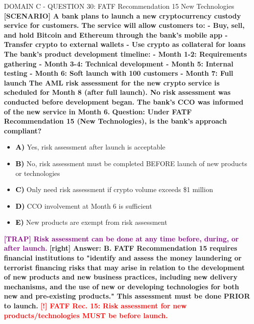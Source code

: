 \documentclass[11pt,a4paper]{beamer}
\newcommand{\redflag}[1]{\textcolor{red}{\textbf{[!] #1}}}
\newcommand{\trap}[1]{\textcolor{purple}{\textbf{[TRAP] #1}}}
\newcommand{\correct}[1]{\textcolor{green!50!black}{\textbf{[right] #1}}}
\newcommand{\scenario}[1]{\textcolor{blue!70!black}{\textbf{[SCENARIO] #1}}}
\newcommand{\option}[1]{\textcolor{black}{\textbf{#1}}}
\begin{document}
\begin{frame}{DOMAIN C - QUESTION 30: FATF Recommendation 15 New Technologies}
\scenario{A bank plans to launch a new cryptocurrency custody service for customers. The service will allow customers to:
- Buy, sell, and hold Bitcoin and Ethereum through the bank's mobile app
- Transfer crypto to external wallets
- Use crypto as collateral for loans
The bank's product development timeline:
- Month 1-2: Requirements gathering
- Month 3-4: Technical development
- Month 5: Internal testing
- Month 6: Soft launch with 100 customers
- Month 7: Full launch
The AML risk assessment for the new crypto service is scheduled for Month 8 (after full launch). No risk assessment was conducted before development began. The bank's CCO was informed of the new service in Month 6.}
\vspace{0.2cm}
\textbf{Question: Under FATF Recommendation 15 (New Technologies), is the bank's approach compliant?}
\vspace{0.1cm}
\begin{itemize}
    \item \option{A)} Yes, risk assessment after launch is acceptable
    \item \option{B)} No, risk assessment must be completed BEFORE launch of new products or technologies
    \item \option{C)} Only need risk assessment if crypto volume exceeds \$1 million
    \item \option{D)} CCO involvement at Month 6 is sufficient
    \item \option{E)} New products are exempt from risk assessment
\end{itemize}
\vspace{0.2cm}
\trap{Risk assessment can be done at any time before, during, or after launch.}
\correct{Answer: B. FATF Recommendation 15 requires financial institutions to "identify and assess the money laundering or terrorist financing risks that may arise in relation to the development of new products and new business practices, including new delivery mechanisms, and the use of new or developing technologies for both new and pre-existing products." This assessment must be done PRIOR to launch.}
\redflag{FATF Rec. 15: Risk assessment for new products/technologies MUST be before launch.}
\end{frame}
\end{document}
